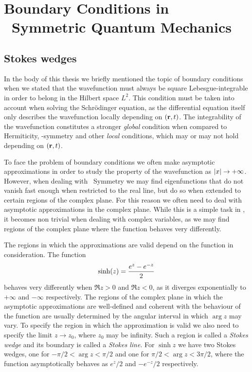 \chapter[Boundary Conditions in \PT\ Symmetric Quantum Mechanics][Boundary Conditions]{Boundary Conditions in \PT\ Symmetric Quantum Mechanics}\label{a:stokes}
    \section*{Stokes wedges}
        In the body of this thesis we briefly mentioned the topic of boundary conditions when we stated that the wavefunction must always be square Lebesgue-integrable in order to belong in the Hilbert space $L^2$. This condition must be taken into account when solving the Schr\"odinger equation, as the differential equation itself only describes the wavefunction locally depending on $\pqty{\vb{r},t}$. The integrability of the wavefunction constitutes a stronger \emph{global} condition when compared to Hermiticity, \PT-symmetry and other \emph{local} conditions, which may or may not hold depending on $\pqty{\vb{r},t}$.

        To face the problem of boundary conditions we often make asymptotic approximations in order to study the property of the wavefunction as $\abs{x}\to+\infty$. However, when dealing with \PT\ Symmetry we may find eigenfunctions that do not vanish fast enough when restricted to the real line, but do so when extended to certain regions of the complex plane. For this reason we often need to deal with asymptotic approximations in the complex plane. While this is a simple task in \bbR, it becomes non trivial when dealing with complex variables, as we may find regions of the complex plane where the function behaves very differently.

        The regions in which the approximations are valid depend on the function in consideration. The function
        \begin{align*}
            \sinh\!\pqty{z} = \frac{e^z - e^{-z}}{2}
        \end{align*}
        behaves very differently when $\Re z > 0$ and $\Re z < 0$, as it diverges exponentially to $+\infty$ and $-\infty$ respectively. The regions of the complex plane in which the asymptotic approximations are well-defined and coherent with the behaviour of the function are usually determined by the angular interval in which $\arg z$ may vary. To specify the region in which the approximation is valid we also need to specify the limit $z \to z_0$, where $z_0$ may be infinity. Such a region is called a \emph{Stokes wedge} and its boundary is called a \emph{Stokes line}. For $\sinh z$ we have two Stokes wedges, one for $-\pi/2 < \arg z < \pi/2$ and one for $\pi/2 < \arg z < 3\pi/2$, where the function asymptotically behaves as $e^z/2$ and $-e^{-z}/2$ respectively. 

